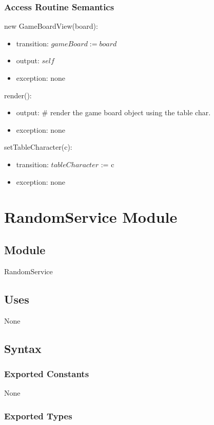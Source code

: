 \documentclass[12pt]{article}
\begin{document}
\subsubsection* {Access Routine Semantics}
new GameBoardView(board):
\begin{itemize}
\item transition: $gameBoard := board$
\item output: $self$
\item exception: none
\end{itemize}
render():
\begin{itemize}
\item output: \# render the game board object using the table char.
\item exception: none
\end{itemize}
setTableCharacter(c):
\begin{itemize}
\item transition: $tableCharacter$ := c
\item exception: none
\end{itemize}
\newpage






\section* {RandomService Module}

\subsection*{Module}

RandomService

\subsection* {Uses}

None

\subsection* {Syntax}

\subsubsection* {Exported Constants}

None

\subsubsection* {Exported Types}
\end{document}
